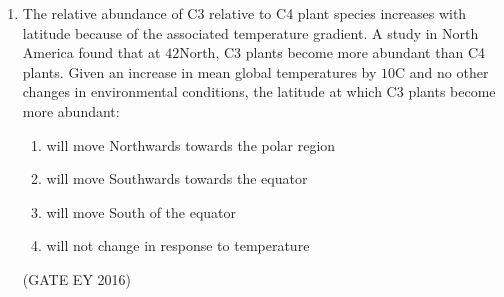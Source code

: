 \documentclass[journal]{IEEEtran}
\begin{document}
\begin{enumerate}[label=Q.\arabic*.]
\item The relative abundance of C3 relative to C4 plant species increases with latitude because of the associated temperature gradient. A study in North America found that at $42$\degree North, C3 plants become more abundant than C4 plants. Given an increase in mean global temperatures by $10$\degree C and no other changes in environmental conditions, the latitude at which C3 plants become more abundant:
\begin{enumerate}
    \item will move Northwards towards the polar region
    \item will move Southwards towards the equator
    \item will move South of the equator
    \item will not change in response to temperature
\end{enumerate}
\hfill{(GATE EY 2016)}

\end{enumerate}
\bigskip
{}
\end{document}

